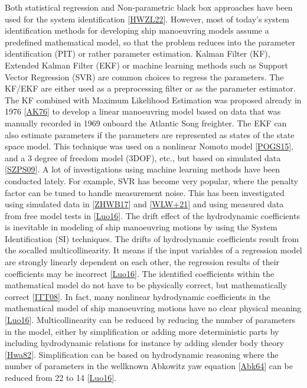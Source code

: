 \documentclass[review]{elsarticle}
\begin{document}
\sphinxAtStartPar
Both statistical regression and Non-parametric black box approaches have been used for the system identification {[}\hyperlink{cite.bibligraphy:id82}{HWZL22}{]}. However, most of today’s system identification methods for developing ship manoeuvring models assume a pre\sphinxhyphen{}defined mathematical model, so that the problem reduces into the parameter identification (PIT) or rather parameter estimation. Kalman Filter (KF), Extended Kalman Filter (EKF) or machine learning methods such as Support Vector Regression (SVR) are common choices to regress the parameters. The KF/EKF are either used as a pre\sphinxhyphen{}processing filter or as the parameter estimator. The KF combined with Maximum Likelihood Estimation was proposed already in 1976 {[}\hyperlink{cite.bibligraphy:id30}{AK76}{]} to develop a linear manoeuvring model based on data that was manually recorded in 1969 onboard the Atlantic Song freighter. The EKF can also estimate parameters if the parameters are represented as states of the state space model. This technique was used on a nonlinear Nomoto model {[}\hyperlink{cite.bibligraphy:id33}{POGS15}{]}, and a 3 degree of freedom model (3DOF), etc., but based on simulated data {[}\hyperlink{cite.bibligraphy:id54}{SZPS09}{]}.
A lot of investigations using machine learning methods have been conducted lately. For example, SVR has become very popular, where the penalty factor can be tuned to handle measurement noise. This has been investigated using simulated data in {[}\hyperlink{cite.bibligraphy:id38}{ZHWB17}{]} and {[}\hyperlink{cite.bibligraphy:id47}{WLW+21}{]} and using measured data from free model tests in {[}\hyperlink{cite.bibligraphy:id56}{Luo16}{]}.
The drift effect of the hydrodynamic coefficients is inevitable in modeling of ship manoeuvring motions by using the System Identification (SI) techniques. The drifts of hydrodynamic coefficients result from the so\sphinxhyphen{}called multicollinearity. It means if the input variables of a regression model are strongly linearly dependent on each other, the regression results of their coefficients may be incorrect {[}\hyperlink{cite.bibligraphy:id56}{Luo16}{]}. The identified coefficients within the mathematical model do not have to be physically correct, but mathematically correct {[}\hyperlink{cite.bibligraphy:id75}{ITT08}{]}. In fact, many nonlinear hydrodynamic coefficients in the mathematical model of ship manoeuvring motions have no clear physical meaning {[}\hyperlink{cite.bibligraphy:id56}{Luo16}{]}. Multicollinearity can be reduced by reducing the number of parameters in the model, either by simplification or adding more deterministic parts by including hydrodynamic relations for instance by adding slender body theory {[}\hyperlink{cite.bibligraphy:id80}{Hwa82}{]}. Simplification can be based on hydrodynamic reasoning where the number of parameters in the well\sphinxhyphen{}known Abkowitz yaw equation {[}\hyperlink{cite.bibligraphy:id25}{Abk64}{]} can be reduced from 22 to 14 {[}\hyperlink{cite.bibligraphy:id56}{Luo16}{]}.
\end{document}
